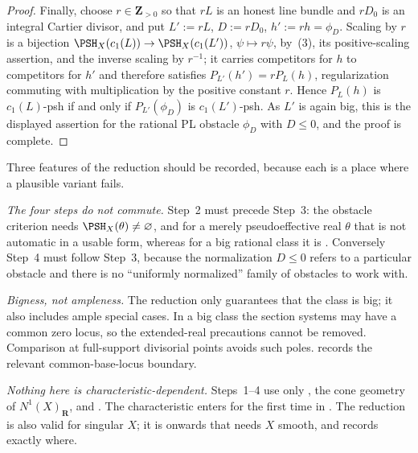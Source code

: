 \begin{proof}
Finally, choose $r\in\mathbf Z_{>0}$ so that $rL$ is an honest line
bundle and $rD_0$ is an integral Cartier divisor, and put
$L':=rL$, $D:=rD_0$, $h':=rh=\phi_D$.  Scaling by $r$ is a bijection
$\PSH_X(c_1(L))\to\PSH_X(c_1(L'))$, $\psi\mapsto r\psi$, by
\,(3), its positive-scaling assertion, and
the inverse scaling by $r^{-1}$; it carries competitors for $h$ to competitors for
$h'$ and therefore satisfies $P_{L'}(h')=rP_L(h)$, regularization
commuting with multiplication by the positive constant $r$.  Hence
$P_L(h)$ is $c_1(L)$-psh if and only if $P_{L'}(\phi_D)$ is
$c_1(L')$-psh.  As $L'$ is again big, this is the displayed assertion
for the rational PL obstacle $\phi_D$ with $D\le0$, and the proof is
complete.
\end{proof}

\begin{remark}
\label{rem:ch40-reduction-cost}
Three features of the reduction should be recorded, because each is a place
where a plausible variant fails.

\emph{The four steps do not commute.}  Step~2 must precede Step~3: the
obstacle criterion  needs
$\PSH_X(\theta)\ne\varnothing$, and for a merely pseudoeffective real
$\theta$ that is not automatic in a usable form, whereas for a big
rational class it is .  Conversely Step~4
must follow Step~3, because the normalization $D\le0$ refers to a
particular obstacle and there is no ``uniformly normalized'' family of
obstacles to work with.

\emph{Bigness, not ampleness.}  The reduction only guarantees that the
class is big; it also includes ample special cases.  In a big class the
section systems may have a common zero locus, so the extended-real
precautions cannot be removed.  Comparison at full-support divisorial
points avoids such poles.   records the
relevant common-base-locus boundary.

\emph{Nothing here is characteristic-dependent.}  Steps~1--4 use only
, the cone geometry of $N^1(X)_{\mathbf R}$,
and .  The characteristic enters for the
first time in .  The reduction is also valid for
singular $X$; it is  onwards that needs $X$
smooth, and  records exactly where.
\end{remark}

